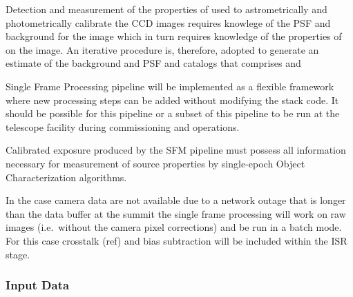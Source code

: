 Detection and measurement of the properties of \Sources used to astrometrically and photometrically calibrate the CCD images requires knowlege of the PSF and background for the image which in turn requires knowledge of the properties of \Sources on the image. An iterative procedure is, therefore, adopted to generate an estimate of the background and PSF and \Source catalogs that comprises \hyperref[sec:apPSFBackground]{}  and \hyperref[sec:apSourcemeasurement]{}



Single Frame Processing pipeline will be implemented as a flexible framework where new processing steps can be added without modifying the stack code. It should be possible for this pipeline or a subset of this pipeline to be run at the telescope facility during commissioning and operations.  


Calibrated exposure produced by the SFM pipeline must possess all information necessary for measurement of source properties by single-epoch Object Characterization algorithms.

 In the case camera data are not available due to a network outage that is longer than the data buffer at the summit the single frame processing will work on raw images (i.e.\ without the camera pixel corrections) and be run in a batch mode. For this case crosstalk (ref) and bias subtraction will be included within the ISR stage.

\subsubsection{Input Data}
\label{sec:apSFMInput}

